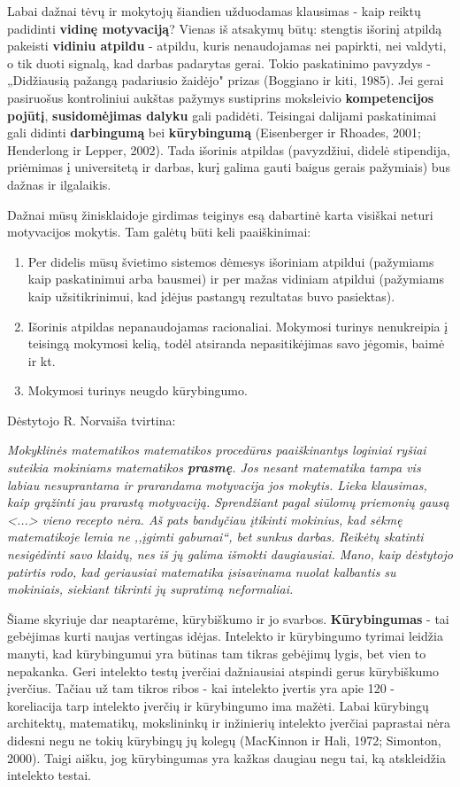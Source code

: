 \documentclass{article}
\begin{document}
Labai dažnai tėvų ir mokytojų šiandien užduodamas klausimas - kaip reiktų padidinti \textbf{vidinę motyvaciją}? Vienas iš atsakymų būtų: stengtis išorinį atpildą pakeisti \textbf{vidiniu atpildu} - atpildu, kuris nenaudojamas nei papirkti, nei valdyti, o tik duoti signalą, kad darbas padarytas gerai. Tokio paskatinimo pavyzdys - „Didžiausią pažangą padariusio žaidėjo" prizas (Boggiano ir kiti, 1985). Jei gerai pasiruošus kontroliniui aukštas pažymys sustiprins moksleivio \textbf{kompetencijos pojūtį}, \textbf{susidomėjimas dalyku} gali padidėti. Teisingai dalijami paskatinimai gali didinti \textbf{darbingumą} bei \textbf{kūrybingumą} (Eisenberger ir Rhoades, 2001; Henderlong ir Lepper, 2002). Tada išorinis atpildas (pavyzdžiui, didelė stipendija, priėmimas į universitetą ir darbas, kurį galima gauti baigus gerais pažymiais) bus dažnas ir ilgalaikis.

Dažnai mūsų žinisklaidoje girdimas teiginys esą dabartinė karta visiškai neturi motyvacijos mokytis. Tam galėtų būti keli paaiškinimai:
\begin{enumerate}
\item Per didelis mūsų švietimo sistemos dėmesys išoriniam atpildui (pažymiams kaip paskatinimui arba bausmei) ir per mažas vidiniam atpildui (pažymiams kaip užsitikrinimui, kad įdėjus pastangų rezultatas buvo pasiektas). 
\item Išorinis atpildas nepanaudojamas racionaliai. Mokymosi turinys nenukreipia į teisingą mokymosi kelią, todėl atsiranda nepasitikėjimas savo jėgomis, baimė ir kt. 
\item Mokymosi turinys neugdo kūrybingumo.
\end{enumerate}

Dėstytojo R. Norvaiša tvirtina:

 \textit{Mokyklinės matematikos matematikos procedūras paaiškinantys loginiai ryšiai suteikia mokiniams matematikos \textbf{prasmę}. Jos nesant matematika tampa vis labiau nesuprantama ir prarandama motyvacija jos mokytis. Lieka klausimas, kaip grąžinti jau prarastą motyvaciją. Sprendžiant pagal siūlomų priemonių gausą <...> vieno recepto nėra. Aš pats bandyčiau įtikinti mokinius, kad sėkmę matematikoje lemia ne ,,įgimti gabumai“, bet sunkus darbas. Reikėtų skatinti nesigėdinti savo klaidų, nes iš jų galima išmokti daugiausiai. Mano, kaip dėstytojo patirtis rodo, kad geriausiai matematika įsisavinama nuolat kalbantis su mokiniais, siekiant tikrinti jų supratimą neformaliai.}

Šiame skyriuje dar neaptarėme, kūrybiškumo ir jo svarbos. \textbf{Kūrybingumas} - tai gebėjimas kurti naujas vertingas idėjas. Intelekto ir kūrybingumo tyrimai leidžia manyti, kad kūrybingumui yra būtinas tam tikras gebėjimų lygis, bet vien to nepakanka. Geri intelekto testų įverčiai dažniausiai atspindi gerus kūrybiškumo įverčius. Tačiau už tam tikros ribos - kai intelekto įvertis yra apie 120 - koreliacija tarp intelekto įverčių ir kūrybingumo ima mažėti. Labai kūrybingų architektų, matematikų, mokslininkų ir inžinierių intelekto įverčiai paprastai nėra didesni negu ne tokių kūrybingų jų kolegų (MacKinnon ir Hali, 1972; Simonton, 2000). Taigi aišku, jog kūrybingumas yra kažkas daugiau negu tai, ką atskleidžia intelekto testai.
\end{document}
